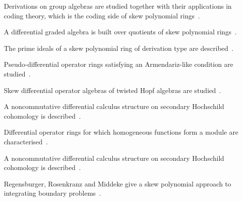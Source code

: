 Derivations on group algebras are studied together with their applications in
coding theory, which is the coding side of skew polynomial
rings~\cite{WlDerivationsOnGroupAlgebrasWith2020}.

A differential graded algebra is built over quotients of skew polynomial
rings~\cite{WlDifferentialGradedAlgebraOverQ2020}.

The prime ideals of a skew polynomial ring of derivation type are
described~\cite{WlPrimeIdealsInSkewPolynomialRin2020}.

Pseudo-differential operator rings satisfying an Armendariz-like condition are
studied~\cite{WlPseudoDifferentialOperatorRing2020}.

Skew differential operator algebras of twisted Hopf algebras are
studied~\cite{WlSkewDifferentialOperatorAlgebr2020}.

A noncommutative differential calculus structure on secondary Hochschild
cohomology is described~\cite{WlNoncommutativeDifferentialCalc2020}.

Differential operator rings for which homogeneous functions form a module are
characterised~\cite{WlDifferentialOperatorRingsForWh2020}.

A noncommutative differential calculus structure on secondary Hochschild
cohomology is described~\cite{WlNoncommutativeDifferentialCalc2020}.

Regensburger, Rosenkranz and Middeke give a skew polynomial approach to
integrating boundary problems~\cite{WlGRegensburgerMRosenkranzJMidde2020}.
